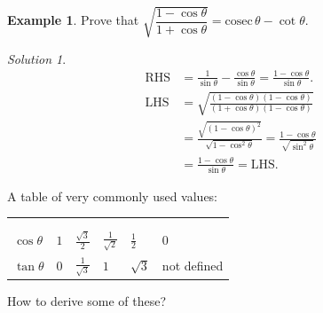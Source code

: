 \documentclass[
  12pt,
  oneside]{book}
\theoremstyle{definition}
\theoremstyle{definition}
\newtheorem{example}{Example}[chapter]
\theoremstyle{definition}
\theoremstyle{definition}
\theoremstyle{remark}
\newtheorem*{solution}{Solution}
\begin{document}
\begin{example}
Prove that \(\sqrt{\dfrac{1-\cos\theta}{1+\cos\theta}} = \mathrm{cosec}\,\theta-\cot\theta\).
\end{example}

\begin{solution}
\begin{align*}
\mathrm{RHS} &= \frac{1}{\sin\theta}-\frac{\cos\theta}{\sin\theta}= \frac{1-\cos\theta}{\sin\theta}.\\
\mathrm{LHS} &= \sqrt{\frac{(1-\cos\theta)(1-\cos\theta)}{(1+\cos\theta)(1-\cos\theta)}} \\
&= \frac{\sqrt{(1-\cos\theta)^2}}{\sqrt{1-\cos^2\theta}} = \frac{1-\cos\theta}{\sqrt{\sin^2\theta}}\\
&= \frac{1-\cos\theta}{\sin\theta} = \mathrm{LHS}.
\end{align*}
\end{solution}

A table of very commonly used values:

\begin{longtable}[]{@{}
  >{\raggedright\arraybackslash}p{}
  >{\centering\arraybackslash}p{}
  >{\centering\arraybackslash}p{}
  >{\centering\arraybackslash}p{}
  >{\centering\arraybackslash}p{}
  >{\centering\arraybackslash}p{}@{}}
\toprule\noalign{}
\endhead
\bottomrule\noalign{}
\endlastfoot
\multirow{2}{=}{\(\theta\)
:---------------
\(\sin\theta\)} & \multirow{2}{=}{\(0\)
:-----:
\(0\)} & \multirow{2}{=}{\(\frac{\pi}6\)
:------------------:
\(\frac12\)} & \multirow{2}{=}{\(\frac{\pi}4\)
:------------------:
\(\frac1{\sqrt2}\)} & \multirow{2}{=}{\(\frac{\pi}3\)
:------------------:
\(\frac{\sqrt3}2\)} & \multirow{2}{=}{\(\frac{\pi}2\)
:---------------:
\(1\)} \\
 \\
\(\cos\theta\) & \(1\) & \(\frac{\sqrt3}2\) & \(\frac1{\sqrt2}\) & \(\frac12\) & \(0\) \\
\(\tan\theta\) & \(0\) & \(\frac1{\sqrt3}\) & \(1\) & \(\sqrt3\) & not defined \\
\end{longtable}

How to derive some of these?
\end{document}
